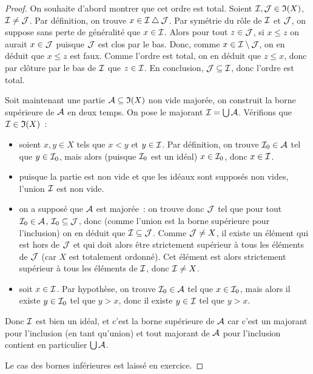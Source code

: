 \begin{proof}
  On souhaite d'abord montrer que cet ordre est total. Soient
  $\mathcal{I},\mathcal{J}\in\mathfrak{I}(X)$, $\mathcal{I}\neq \mathcal{J}$. Par définition, on trouve
  $x\in \mathcal{I}\mathbin{\triangle} \mathcal{J}$. Par symétrie du rôle de
  $\mathcal{I}$ et $\mathcal{J}$, on suppose sans perte de généralité que $x\in \mathcal{I}$.
  Alors pour tout $z\in \mathcal{J}$, si $x \leq z$ on aurait $x\in \mathcal{J}$ puisque
  $\mathcal{J}$ est clos par le bas. Donc, comme $x\in \mathcal{I}\setminus \mathcal{J}$, on
  en déduit que $x \leq z$ est faux. Comme l'ordre est total, on en déduit que
  $z\leq x$, donc par clôture par le bas de $\mathcal{I}$ que $z\in \mathcal{I}$. En
  conclusion, $\mathcal{J}\subseteq \mathcal{I}$, donc l'ordre est total.

  Soit maintenant une partie $\mathcal A\subseteq \mathfrak{I}(X)$ non vide majorée, on
  construit la borne supérieure de $\mathcal A$ en deux temps. On pose le majorant
  $\mathcal{I} = \bigcup \mathcal A$. Vérifions que $\mathcal{I} \in \mathfrak{I}(X)$~:
  \begin{itemize}
  \item soient $x,y \in X$ tels que $x < y$ et $y \in \mathcal{I}$. Par définition,
    on trouve $\mathcal{I}_0 \in \mathcal A$ tel que $y \in \mathcal{I}_0$, mais alors
    (puisque $\mathcal{I}_0$ est un idéal) $x \in \mathcal{I}_0$, donc $x \in \mathcal{I}$.
  \item puisque la partie est non vide et que les idéaux sont supposés non
    vides, l'union $\mathcal{I}$ est non vide.
  \item on a supposé que $\mathcal A$ est majorée~: on trouve donc $\mathcal{J}$
    tel que pour tout $\mathcal{I}_0 \in \mathcal A$, $\mathcal{I}_0\subseteq \mathcal{J}$,
    donc (comme l'union est la borne supérieure pour l'inclusion) on en déduit
    que $\mathcal{I}\subseteq\mathcal{J}$. Comme $\mathcal{J}\neq X$, il existe un élément
    qui est hors de $\mathcal{J}$ et qui doit alors être strictement supérieur à
    tous les éléments de $\mathcal{J}$ (car $X$ est totalement ordonné). Cet élément
    est alors strictement supérieur à tous les éléments de $\mathcal{I}$, donc
    $\mathcal{I}\neq X$.
  \item soit $x \in \mathcal{I}$. Par hypothèse, on trouve $\mathcal{I}_0\in\mathcal A$ tel
    que $x \in \mathcal{I}_0$, mais alors il existe $y \in \mathcal{I}_0$ tel que
    $y > x$, donc il existe $y \in \mathcal{I}$ tel que $y > x$.
  \end{itemize}
  Donc $\mathcal{I}$ est bien un idéal, et c'est la borne supérieure de $\mathcal A$
  car c'est un majorant pour l'inclusion (en tant qu'union) et tout majorant
  de $\mathcal A$ pour l'inclusion contient en particulier $\bigcup\mathcal A$.

  \noindent
  Le cas des bornes inférieures est laissé en exercice.
\end{proof}

